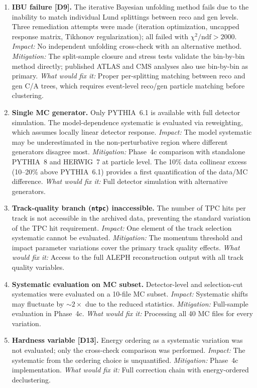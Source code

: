 \documentclass[11pt,a4paper]{article}
\begin{document}
\begin{enumerate}
\item \textbf{IBU failure [D9].}  The iterative Bayesian unfolding
  method fails due to the inability to match individual Lund splittings
  between reco and gen levels.  Three remediation attempts were made
  (iteration optimization, uncapped response matrix, Tikhonov
  regularization); all failed with $\chi^2/\text{ndf} > 2000$.
  \emph{Impact:} No independent unfolding cross-check with an
  alternative method.  \emph{Mitigation:} The split-sample closure and
  stress tests validate the bin-by-bin method directly; published ATLAS
  and CMS analyses also use bin-by-bin as primary.
  \emph{What would fix it:} Proper per-splitting matching between reco
  and gen C/A trees, which requires event-level reco/gen particle
  matching before clustering.

\item \textbf{Single MC generator.}  Only PYTHIA~6.1 is available with
  full detector simulation.  The model-dependence systematic is
  evaluated via reweighting, which assumes locally linear detector
  response.  \emph{Impact:} The model systematic may be underestimated
  in the non-perturbative region where different generators disagree
  most.  \emph{Mitigation:} Phase~4c comparison with standalone
  PYTHIA~8 and HERWIG~7 at particle level.  The 10\% data collinear
  excess (10--20\% above PYTHIA~6.1) provides a first quantification of
  the data/MC difference.
  \emph{What would fix it:} Full detector simulation with alternative
  generators.

\item \textbf{Track-quality branch (\texttt{ntpc}) inaccessible.}  The
  number of TPC hits per track is not accessible in the archived data,
  preventing the standard variation of the TPC hit requirement.
  \emph{Impact:} One element of the track selection systematic cannot be
  evaluated.  \emph{Mitigation:} The momentum threshold and impact
  parameter variations cover the primary track quality effects.
  \emph{What would fix it:} Access to the full ALEPH reconstruction
  output with all track quality variables.

\item \textbf{Systematic evaluation on MC subset.}  Detector-level
  and selection-cut systematics were evaluated on a 10-file MC subset.
  \emph{Impact:} Systematic shifts may fluctuate by $\sim\!2\times$ due
  to the reduced statistics.  \emph{Mitigation:} Full-sample evaluation
  in Phase~4c.
  \emph{What would fix it:} Processing all 40 MC files for every
  variation.

\item \textbf{Hardness variable [D13].}  Energy ordering as a
  systematic variation was not evaluated; only the cross-check
  comparison was performed.  \emph{Impact:} The systematic from the
  ordering choice is unquantified.  \emph{Mitigation:} Phase~4c
  implementation.
  \emph{What would fix it:} Full correction chain with energy-ordered
  declustering.
\end{enumerate}
\end{document}

